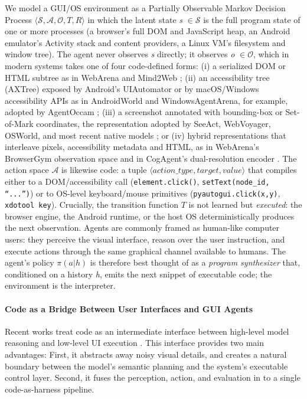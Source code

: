 We model a GUI/OS environment as a Partially Observable Markov Decision Process $\langle \mathcal{S}, \mathcal{A}, \mathcal{O}, T, R\rangle$ in which the latent state \textit{s} $\in \mathcal{S}$ is the full program state of one or more processes (a browser's full DOM and JavaScript heap, an Android emulator's Activity stack and content providers, a Linux VM's filesystem and window tree). The agent never observes \textit{s} directly; it observes \textit{o} $\in \mathcal{O}$, which in modern systems takes one of four code-defined forms: (i) a serialized DOM or HTML subtree as in WebArena and Mind2Web \citep{zhou2024webarenarealisticwebenvironment,deng2023mind2webgeneralistagentweb}; (ii) an accessibility tree (AXTree) exposed by Android's UIAutomator or by macOS/Windows accessibility APIs as in AndroidWorld and WindowsAgentArena, for example, adopted by AgentOccam \citep{rawles2025androidworlddynamicbenchmarkingenvironment,bonatti2024windowsagentarenaevaluating,yang2024agentoccam}; (iii) a screenshot annotated with bounding-box or Set-of-Mark coordinates, the representation adopted by SeeAct, WebVoyager, OSWorld, and most recent native models \citep{zheng2024gpt4visiongeneralistwebagent,he2024webvoyagerbuildingendtoendweb,xie2024osworldbenchmarkingmultimodalagents,yang2023setofmarkpromptingunleashesextraordinary}; or (iv) hybrid representations that interleave pixels, accessibility metadata and HTML, as in WebArena's BrowserGym observation space and in CogAgent's dual-resolution encoder \citep{drouin2024workarenacapablewebagents,hong2024cogagentvisuallanguagemodel}. The action space $\mathcal{A}$ is likewise code: a tuple $\langle action\_type, target, value\rangle$ that compiles either to a DOM/accessibility call (\texttt{element.click()}, \texttt{setText(node\_id, ``...'')}) or to OS-level keyboard/mouse primitives (\texttt{pyautogui.click(x,y)}, \texttt{xdotool key}). Crucially, the transition function $T$ is not learned but \textit{executed}: the browser engine, the Android runtime, or the host OS deterministically produces the next observation. Agents are commonly framed as human-like computer users: they perceive the visual interface, reason over the user instruction, and execute actions through the same graphical channel available to humans. The agent's policy $\pi(a|h)$ is therefore best thought of as a \textit{program synthesizer} that, conditioned on a history \textit{h}, emits the next snippet of executable code; the environment is the interpreter.


\paragraph{Code as a Bridge Between User Interfaces and GUI Agents} 
Recent works treat code as an intermediate interface between high-level model reasoning and low-level UI execution \citep{xie2024osworldbenchmarkingmultimodalagents, wang2025guiagentsfoundationmodels,
xu2024androidlabtrainingsystematicbenchmarking}. This interface provides two main advantages: First, it abstracts away noisy visual details, and creates a natural boundary between the model's semantic planning and the system's executable control layer. Second, it fuses the perception, action, and evaluation in to a single code-as-harness pipeline.

